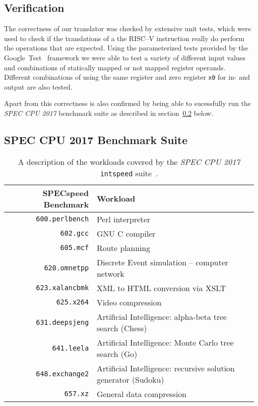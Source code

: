 \subsection{Verification}
The correctness of our translator was checked by extensive unit tests, which were used to check if the translations of a the RISC--V instruction really do perform the operations that are expected.
Using the parameterized tests provided by the Google~Test~\cite{gtest} framework we were able to test a variety of different input values and combinations of statically mapped or not mapped register operands.
Different combinations of using the same register and zero register \texttt{x0} for in- and output are also tested.

Apart from this correctness is also confirmed by being able to sucessfully run the \textit{SPEC CPU 2017} benchmark suite as described in section~\ref{subsec:spec-cpu-2017-benchmark-suite} below.


\subsection{SPEC CPU 2017 Benchmark Suite}
\label{subsec:spec-cpu-2017-benchmark-suite}


\begin{table}
	\centering
	\begin{tabular}{rl}
		\toprule
		\textbf{SPECspeed Benchmark} & \textbf{Workload}\\
		\midrule
		\texttt{600.perlbench} & Perl interpreter\\
		\texttt{602.gcc} & GNU C compiler\\
		\texttt{605.mcf} & Route planning\\
		\texttt{620.omnetpp} & Discrete Event simulation -- computer network\\
		\texttt{623.xalancbmk} & XML to HTML conversion via XSLT\\
		\texttt{625.x264} & Video compression\\
		\texttt{631.deepsjeng} & Artificial Intelligence: alpha-beta tree search (Chess)\\
		\texttt{641.leela} & Artificial Intelligence: Monte Carlo tree search (Go)\\
		\texttt{648.exchange2} & Artificial Intelligence: recursive solution generator (Sudoku)\\
		\texttt{657.xz} & General data compression\\
		\bottomrule
	\end{tabular}
	\caption[SPEC CPU 2017 workload description]%
	{A description of the workloads covered by the \textit{SPEC CPU 2017} \texttt{intspeed} suite~\cite{spec-cpu-doc}.}
	\label{tab:spec-description}
\end{table}


